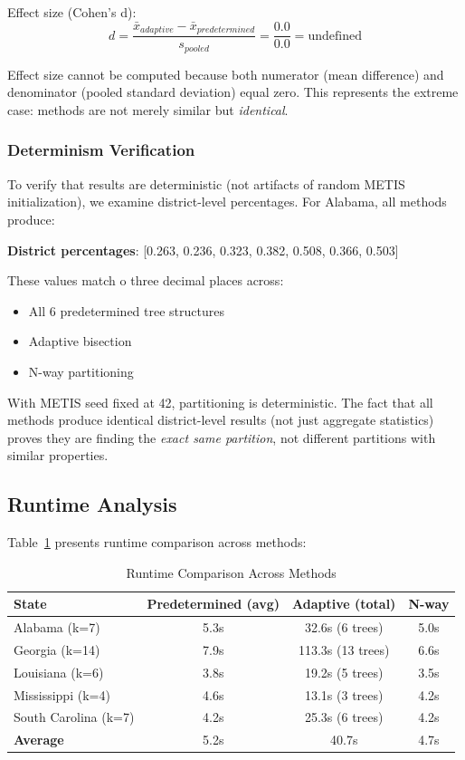 Effect size (Cohen's d):
\begin{equation}
d = \frac{\bar{x}_{adaptive} - \bar{x}_{predetermined}}{s_{pooled}} = \frac{0.0}{0.0} = \text{undefined}
\end{equation}

Effect size cannot be computed because both numerator (mean difference) and denominator (pooled standard deviation) equal zero. This represents the extreme case: methods are not merely similar but \textit{identical}.

\subsubsection{Determinism Verification}

To verify that results are deterministic (not artifacts of random METIS initialization), we examine district-level percentages. For Alabama, all methods produce:

\textbf{District percentages}: [0.263, 0.236, 0.323, 0.382, 0.508, 0.366, 0.503]

These values match 	o three decimal places across:
\begin{itemize}
\item All 6 predetermined tree structures
\item Adaptive bisection
\item N-way partitioning
\end{itemize}

With METIS seed fixed at 42, partitioning is deterministic. The fact that all methods produce identical district-level results (not just aggregate statistics) proves they are finding the \textit{exact same partition}, not different partitions with similar properties.

\subsection{Runtime Analysis}

Table~\ref{tab:runtime_comparison} presents runtime comparison across methods:

\begin{table}[h]
\centering
\caption{Runtime Comparison Across Methods}
\label{tab:runtime_comparison}
\begin{tabular}{lccc}
\toprule
\textbf{State} & \textbf{Predetermined (avg)} & \textbf{Adaptive (total)} & \textbf{N-way} \\
\midrule
Alabama (k=7) & 5.3s & 32.6s (6 trees) & 5.0s \\
Georgia (k=14) & 7.9s & 113.3s (13 trees) & 6.6s \\
Louisiana (k=6) & 3.8s & 19.2s (5 trees) & 3.5s \\
Mississippi (k=4) & 4.6s & 13.1s (3 trees) & 4.2s \\
South Carolina (k=7) & 4.2s & 25.3s (6 trees) & 4.2s \\
\midrule
\textbf{Average} & 5.2s & 40.7s & 4.7s \\
\bottomrule
\end{tabular}
\end{table}

